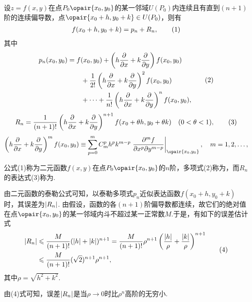 \begin{theorem}\label{theorem:多元函数微分法.二元函数的泰勒公式}
\def\oprt#1{\left(h\pdv{x}+k\pdv{y}\right)\ifx\relax#1\relax\else^{#1}\fi}
设\(z=f(x,y)\)在点\(P_0\opair{x_0,y_0}\)的某一邻域\(U(P_0)\)内连续且有直到\((n+1)\)阶的连续偏导数，点\(\opair{x_0+h,y_0+k} \in U(P_0)\)，则有
\begin{gather}
f(x_0+h,y_0+k) = p_n + R_n,
\tag1
\end{gather}
其中\begin{gather}
\label{equation:多元函数微分法.二元函数的泰勒多项式}
\begin{split}
p_n(x_0,y_0)
&=f(x_0,y_0)
 + \oprt{} f(x_0,y_0) \\
&\hspace{20pt}+ \frac{1}{2!} \oprt{2} f(x_0,y_0) \\
&\hspace{20pt}+ \dotsb + \frac{1}{n!} \oprt{n} f(x_0,y_0),
\end{split}
\tag2
\end{gather}
\begin{gather}
\label{equation:多元函数微分法.二元函数的泰勒公式的拉格朗日型余项}
R_n = \frac{1}{(n+1)!} \oprt{n+1} f(x_0+\theta h,y_0+\theta k)
\quad (0 < \theta < 1),
\tag3
\end{gather}\[
\oprt{m} f(x_0,y_0)
\equiv
\sum\limits_{p=0}^{m} C_m^p h^p k^{m-p}
 \eval{\frac{\partial^m f}{\partial x^p \partial y^{m-p}}}_{\opair{x_0,y_0}},
\quad m=1,2,\dotsc,
\]

公式(1)称为二元函数\(f(x,y)\)在点\(P_0\opair{x_0,y_0}\)的\(n\)阶，多项式(2)称为，而\(R_n\)的表达式(3)称为.
\end{theorem}
由二元函数的泰勒公式可知，以泰勒多项式\(p_n\)近似表达函数\(f(x_0+h,y_0+k)\)时，其误差为\(\abs{R_n}\).
由假设，函数的各\((n+1)\)阶偏导数都连续，故它们的绝对值在点\(\opair{x_0,y_0}\)的某一邻域内斗不超过某一正常数\(M\).于是，有如下的误差估计式\begin{gather}
\begin{split}
\abs{R_n}
&\leqslant \frac{M}{(n+1)!} (\abs{h}+\abs{k})^{n+1}
= \frac{M}{(n+1)!} \rho^{n+1} \left( \frac{\abs{h}}{\rho} + \frac{\abs{k}}{\rho} \right)^{n+1} \\
&\leqslant \frac{M}{(n+1)!} (\sqrt{2})^{n+1} \rho^{n+1},
\end{split}
\tag4
\end{gather}其中\(\rho=\sqrt{h^2+k^2}\).

由(4)式可知，误差\(\abs{R_n}\)是当\(\rho\to0\)时比\(\rho^n\)高阶的无穷小.

